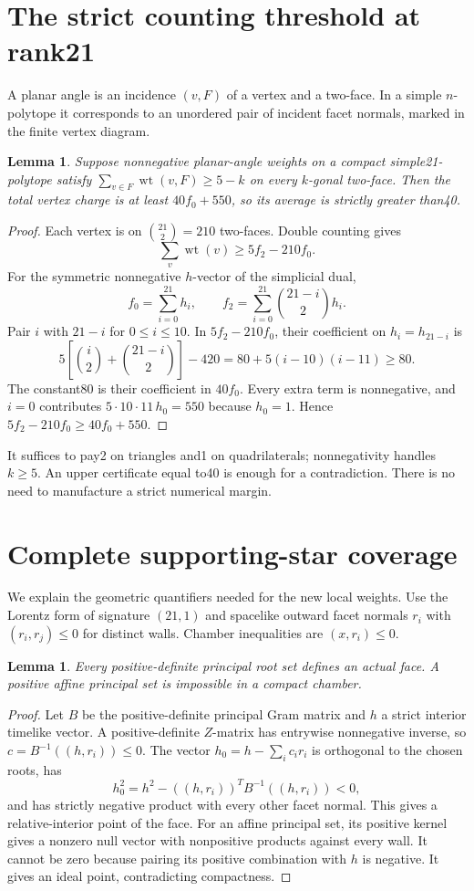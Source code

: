 \documentclass[11pt]{article}
\newtheorem{lemma}[theorem]{Lemma}
\newcommand{\wt}{\operatorname{wt}}
\begin{document}
\section{The strict counting threshold at rank21}
A planar angle is an incidence $(v,F)$ of a vertex and a two-face. In
a simple $n$-polytope it corresponds to an unordered pair of incident
facet normals, marked in the finite vertex diagram.
\begin{lemma}\label{lem:threshold}
Suppose nonnegative planar-angle weights on a compact simple21-polytope
satisfy $\sum_{v\in F}\wt(v,F)\ge5-k$ on every $k$-gonal two-face.
Then the total vertex charge is at least $40f_0+550$, so its average
is strictly greater than40.
\end{lemma}
\begin{proof}
Each vertex is on $\binom{21}{2}=210$ two-faces. Double counting gives
\[
 \sum_v\wt(v)\ge5f_2-210f_0.
\]
For the symmetric nonnegative $h$-vector of the simplicial dual,
\[
 f_0=\sum_{i=0}^{21}h_i,\qquad
 f_2=\sum_{i=0}^{21}\binom{21-i}{2}h_i.
\]
Pair $i$ with $21-i$ for $0\le i\le10$. In $5f_2-210f_0$, their
coefficient on $h_i=h_{21-i}$ is
\[
 5\left[\binom i2+\binom{21-i}{2}\right]-420
 =80+5(i-10)(i-11)\ge80.
\]
The constant80 is their coefficient in $40f_0$. Every extra term is
nonnegative, and $i=0$ contributes $5\cdot10\cdot11\,h_0=550$ because
$h_0=1$. Hence $5f_2-210f_0\ge40f_0+550$.
\end{proof}
It suffices to pay2 on triangles and1 on quadrilaterals; nonnegativity
handles $k\ge5$. An upper certificate equal to40 is enough for a
contradiction. There is no need to manufacture a strict numerical margin.

\section{Complete supporting-star coverage}
We explain the geometric quantifiers needed for the new local weights.
Use the Lorentz form of signature $(21,1)$ and spacelike outward facet
normals $r_i$ with $(r_i,r_j)\le0$ for distinct walls. Chamber inequalities
are $(x,r_i)\le0$.
\begin{lemma}\label{lem:projection}
Every positive-definite principal root set defines an actual face. A
positive affine principal set is impossible in a compact chamber.
\end{lemma}
\begin{proof}
Let $B$ be the positive-definite principal Gram matrix and $h$ a strict
interior timelike vector. A positive-definite $Z$-matrix has entrywise
nonnegative inverse, so $c=B^{-1}((h,r_i))\le0$. The vector
$h_0=h-\sum_i c_i r_i$ is orthogonal to the chosen roots, has
\[
 h_0^2=h^2-((h,r_i))^TB^{-1}((h,r_i))<0,
\]
and has strictly negative product with every other facet normal. This
gives a relative-interior point of the face. For an affine principal set,
its positive kernel gives a nonzero null vector with nonpositive products
against every wall. It cannot be zero because pairing its positive
combination with $h$ is negative. It gives an ideal point, contradicting
compactness.
\end{proof}
\end{document}
